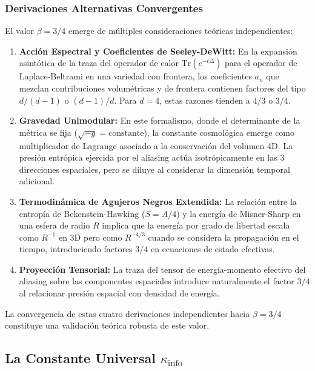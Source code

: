 \documentclass[11pt, a4paper]{article}
\theoremstyle{plain}
\theoremstyle{definition}
\newcommand{\Kinfo}{\kappa_{\text{info}}}
\begin{document}
\subsubsection{Derivaciones Alternativas Convergentes}

El valor $\beta = 3/4$ emerge de múltiples consideraciones teóricas independientes:

\begin{enumerate}
    \item \textbf{Acción Espectral y Coeficientes de Seeley-DeWitt:} En la expansión asintótica de la traza del operador de calor $\text{Tr}(e^{-t\Delta})$ para el operador de Laplace-Beltrami en una variedad con frontera, los coeficientes $a_n$ que mezclan contribuciones volumétricas y de frontera contienen factores del tipo $d/(d-1)$ o $(d-1)/d$. Para $d=4$, estas razones tienden a $4/3$ o $3/4$.
    
    \item \textbf{Gravedad Unimodular:} En este formalismo, donde el determinante de la métrica se fija ($\sqrt{-g} = \text{constante}$), la constante cosmológica emerge como multiplicador de Lagrange asociado a la conservación del volumen 4D. La presión entrópica ejercida por el aliasing actúa isotrópicamente en las 3 direcciones espaciales, pero se diluye al considerar la dimensión temporal adicional.
    
    \item \textbf{Termodinámica de Agujeros Negros Extendida:} La relación entre la entropía de Bekenstein-Hawking ($S = A/4$) y la energía de Misner-Sharp en una esfera de radio $R$ implica que la energía por grado de libertad escala como $R^{-1}$ en 3D pero como $R^{-4/3}$ cuando se considera la propagación en el tiempo, introduciendo factores $3/4$ en ecuaciones de estado efectivas.
    
    \item \textbf{Proyección Tensorial:} La traza del tensor de energía-momento efectivo del aliasing sobre las componentes espaciales introduce naturalmente el factor $3/4$ al relacionar presión espacial con densidad de energía.
\end{enumerate}

La convergencia de estas cuatro derivaciones independientes hacia $\beta = 3/4$ constituye una validación teórica robusta de este valor.

\subsection{La Constante Universal \texorpdfstring{$\Kinfo$}{κ\_info}}
\end{document}
